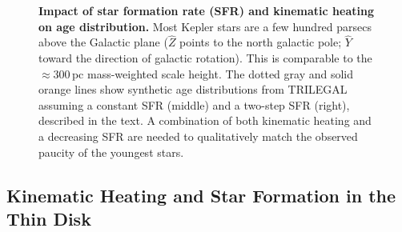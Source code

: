 \documentclass[11pt,twocolumn,tighten]{aastex63}
\begin{document}
\begin{figure}[!t]
	\begin{center}
		\leavevmode
	\end{center}
	\vspace{-0.5cm}
	\caption{{\bf Impact of star formation rate (SFR) and kinematic heating on age distribution.}   
		Most Kepler stars are a few hundred parsecs above the Galactic plane ($\hat{Z}$ points to the north galactic pole;  $\hat{Y}$ toward the direction of
		galactic rotation).  This is comparable to the $\approx$300\,pc mass-weighted scale height.
		The dotted gray and solid orange lines show synthetic age distributions
		from TRILEGAL assuming a constant SFR (middle) and a two-step
		SFR (right), described in the text.
		A combination of both kinematic heating and
		a decreasing SFR are needed to qualitatively match the observed paucity of the youngest stars.
		\label{fig:trilegal}
	}
\end{figure}

\subsection{Kinematic Heating and Star Formation in the Thin Disk}
\label{subsec:trilegal}

\end{document}
